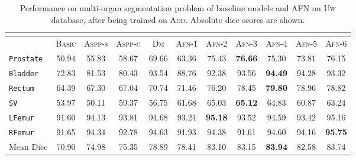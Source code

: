 \documentclass{llncs}
\begin{document}
\begin{table*}[t]
    \centering
    \small
    \begin{tabular}{lcccccccccc}
        \multicolumn{11}{c}{}\\
        \hline
            & \textsc{Basic}        & \textsc{Aspp-s}   & \textsc{Aspp-c}    &  \textsc{Dm}  & \textsc{Afn}-1          & \textsc{Afn}-2          & \textsc{Afn}-3          & \textsc{Afn}-4          & \textsc{Afn}-5          & \textsc{Afn}-6          \\
        \hline
 \texttt{Prostate} & 50.94 &   55.83 &  58.67& 69.66&  63.36 &  75.43 &  \textbf{76.66}&   75.30 &  73.81 &  76.15 \\

       \texttt{Bladder} &   72.83  &  81.53& 80.43  &93.54 & 88.76  & 92.38  & 93.56 &  \textbf{94.49}  & 94.28  & 93.32  \\
    \texttt{Rectum}&    64.39 &   67.30&  67.04& 70.74 &  71.46 &  76.20 &  78.45&   \textbf{79.80} &  78.96 &  78.82 \\
\texttt{SV}&   53.97  & 50.11 & 59.37 & 56.75  & 61.68  & 65.03  & \textbf{65.12} &  64.83  & 60.87  & 63.24  \\

       \texttt{LFemur}&  91.60   &  94.13 & 93.81&94.68  & 93.24  & \textbf{95.18}  & 93.52 &  94.59  & 93.42  & 95.16  \\

       \texttt{RFemur}&  91.65  &  94.34 & 92.78 &94.63  & 91.93  & 94.38  & 91.61 &  94.60  & 94.16  & \textbf{95.75}  \\
 \hline
         Mean Dice &     70.90 &     74.98 & 75.35& 78.89&78.41 &  83.10 &  83.15&   \textbf{83.94} &  82.58 &  83.74 \\
\hline
    \end{tabular}
    \caption{Performance on multi-organ segmentation problem of baseline models and AFN on \textsc{Uw} database, after being trained on \textsc{Add}. Absolute dice scores are shown.}
    \label{prostate}
    \vspace{-9mm}
\end{table*}
\end{document}
